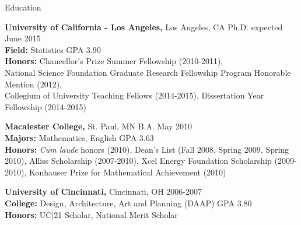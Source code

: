 \documentclass{resume} %
\begin{document}

\begin{rSection}{Education}

{\bf University of California - Los Angeles,} Los Angeles, CA \hfill Ph.D. expected June 2015\\ 
{\bf Field:} Statistics \hfill GPA 3.90 \smallskip \\
{\bf Honors:} Chancellor's Prize Summer Fellowship (2010-2011), \\National Science Foundation Graduate Research Fellowship Program Honorable Mention (2012), \\Collegium of University Teaching Fellows (2014-2015), Dissertation Year Fellowship (2014-2015)

{\bf Macalester College,} St. Paul, MN \hfill B.A. May 2010 \\
{\bf Majors:} Mathematics, English \hfill GPA 3.63 \smallskip \\
{\bf Honors:} {\em Cum laude} honors (2010), Dean's List (Fall 2008, Spring 2009, Spring 2010), Alliss Scholarship (2007-2010), Xcel Energy Foundation Scholarship (2009-2010), Konhauser Prize for Mathematical Achievement (2010)

{\bf University of Cincinnati,} Cincinnati, OH \hfill 2006-2007 \\
{\bf College:} Design, Architecture, Art and Planning (DAAP) \hfill GPA 3.80 \smallskip \\
{\bf Honors:} UC$|$21 Scholar, National Merit Scholar

\end{rSection}

\end{document}
